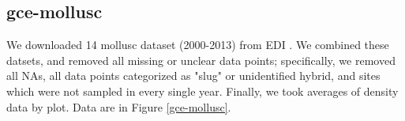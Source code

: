 \documentclass[11pt, oneside]{article}
\begin{document}
%
%
%
%
%
%
\subsection {gce-mollusc}
We downloaded 14 mollusc dataset (2000-2013) from EDI \citep{project_mollusc_2014, project_mollusc_2014-1, project_mollusc_2014-2, project_mollusc_2014-3, project_mollusc_2014-4, project_mollusc_2014-5, project_mollusc_2014-6, project_mollusc_2014-7, project_mollusc_2014-8, project_mollusc_2014-9, project_mollusc_2014-10, project_mollusc_2014-11, project_mollusc_2014-12, project_mollusc_2014-13}. We combined these datsets, and removed all missing or unclear data points; specifically, we removed all NAs, all data points categorized as "slug" or unidentified hybrid, and sites which were not sampled in every single year. Finally, we took averages of density data by plot. %
Data are in Figure \ref{gce-mollusc}.
\end{document}
